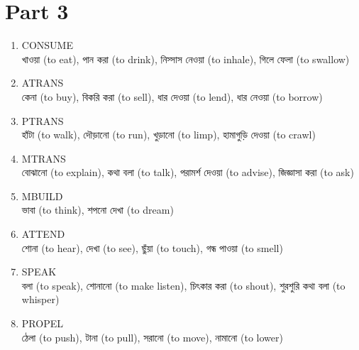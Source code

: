 \documentclass[11pt,a4paper,twocolumn]{article}
\begin{document}
	\section{Part 3}
	{\bg
	\begin{enumerate}
	
		\item CONSUME\\
		\textcolor{hlit}{খাওয়া} (to eat), \textcolor{hlit}{পান করা} (to drink), 
		\textcolor{hlit}{নিস্সাস নেওয়া} (to inhale), \textcolor{hlit}{গিলে ফেলা} (to swallow)\\
		
		\item ATRANS\\
		\textcolor{hlit}{কেনা} (to buy), \textcolor{hlit}{বিকরি করা} (to sell), 
		\textcolor{hlit}{ধার দেওয়া} (to lend), \textcolor{hlit}{ধার নেওয়া} (to borrow)\\
		
		\item PTRANS\\
		\textcolor{hlit}{হাঁটা} (to walk), \textcolor{hlit}{দৌড়ানো} (to run), 
		\textcolor{hlit}{খুড়ানো} (to limp), \textcolor{hlit}{হামাগুড়ি দেওয়া} (to crawl)\\
		
		\item MTRANS\\
		\textcolor{hlit}{বোঝানো} (to explain), \textcolor{hlit}{কথা বলা} (to talk), 
		\textcolor{hlit}{পরামর্শ দেওয়া} (to advise), \textcolor{hlit}{জিজ্ঞাসা করা} (to ask)\\
		
		\item MBUILD\\
		\textcolor{hlit}{ভাবা} (to think), \textcolor{hlit}{শপনো দেখা} (to dream)\\
		
		\item ATTEND\\
		\textcolor{hlit}{শোনা} (to hear), \textcolor{hlit}{দেখা} (to see), 
		\textcolor{hlit}{ছুঁয়া} (to touch), \textcolor{hlit}{গন্ধ পাওয়া} (to smell)\\
		
		\item SPEAK\\
		\textcolor{hlit}{বলা} (to speak), \textcolor{hlit}{শোনানো} (to make listen), 
		\textcolor{hlit}{চিৎকার করা} (to shout), \textcolor{hlit}{শুরশুরি কথা বলা} (to whisper)\\
		
		\item PROPEL\\
		\textcolor{hlit}{ঠেলা} (to push), \textcolor{hlit}{টানা} (to pull), 
		\textcolor{hlit}{সরানো} (to move), \textcolor{hlit}{নামানো} (to lower)\\
		

\end{enumerate}}
\end{document}
